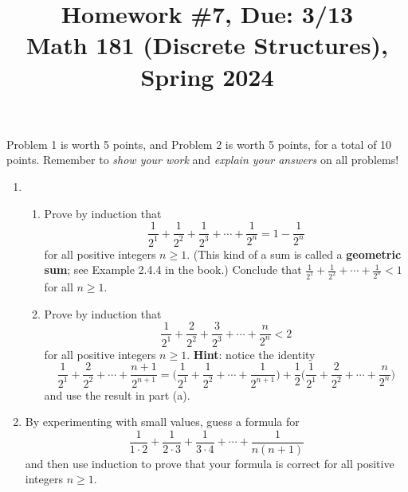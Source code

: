 \documentclass[11pt]{article}
\title{Homework \#7, Due: 3/13 \\Math 181 (Discrete Structures), Spring 2024}
\date{}
\begin{document}
\maketitle

\thispagestyle{empty}

\vspace{-1cm}

Problem 1 is worth 5 points, and Problem 2 is worth 5 points, for a total of 10 points. Remember to \emph{show your work} and \emph{explain your answers} on all problems!

\begin{enumerate}
\item \begin{enumerate}
\item Prove by induction that
\[\frac{1}{2^1} + \frac{1}{2^2} + \frac{1}{2^3} + \cdots + \frac{1}{2^n} = 1- \frac{1}{2^n}\]
for all positive integers $n \geq 1$. (This kind of a sum is called a {\bf geometric sum}; see Example 2.4.4 in the book.) Conclude that $\frac{1}{2^1} + \frac{1}{2^2} + \cdots + \frac{1}{2^n}  < 1$ for all $n \geq 1$.
\item Prove by induction that
\[\frac{1}{2^1} + \frac{2}{2^2} + \frac{3}{2^3} + \cdots + \frac{n}{2^n} < 2\]
for all positive integers $n \geq 1$. {\bf Hint}: notice the identity
\[\frac{1}{2^1} + \frac{2}{2^2} + \cdots + \frac{n+1}{2^{n+1}} = \big ( \frac{1}{2^1} + \frac{1}{2^2} + \cdots + \frac{1}{2^{n+1}} \big ) + \frac{1}{2} \big(\frac{1}{2^1} + \frac{2}{2^2} + \cdots + \frac{n}{2^n}\big) \]
and use the result in part (a).
\end{enumerate}
\item By experimenting with small values, guess a formula for
\[\frac{1}{1\cdot 2} + \frac{1}{2 \cdot 3} + \frac{1}{3 \cdot 4} + \cdots + \frac{1}{n (n+1)}\]
and then use induction to prove that your formula is correct for all positive integers $n \geq 1$.
\end{enumerate}
\end{document}
